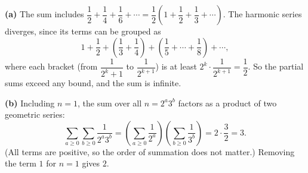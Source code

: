 \textbf{(a)} The sum includes $\dfrac12+\dfrac14+\dfrac16+\cdots=\dfrac12\left(1+\dfrac12+\dfrac13+\cdots\right)$. The harmonic series diverges, since its terms can be grouped as
\[1+\dfrac12+\left(\dfrac13+\dfrac14\right)+\left(\dfrac15+\cdots+\dfrac18\right)+\cdots,\]
where each bracket (from $\dfrac1{2^k+1}$ to $\dfrac1{2^{k+1}}$) is at least $2^k\cdot\dfrac1{2^{k+1}}=\dfrac12$. So the partial sums exceed any bound, and the sum is infinite.

\textbf{(b)} Including $n=1$, the sum over all $n=2^a3^b$ factors as a product of two geometric series:
\[\sum_{a\ge0}\sum_{b\ge0}\dfrac1{2^a3^b}=\left(\sum_{a\ge0}\dfrac1{2^a}\right)\left(\sum_{b\ge0}\dfrac1{3^b}\right)=2\cdot\dfrac32=3.\]
(All terms are positive, so the order of summation does not matter.) Removing the term $1$ for $n=1$ gives $\boxed{2}$.
